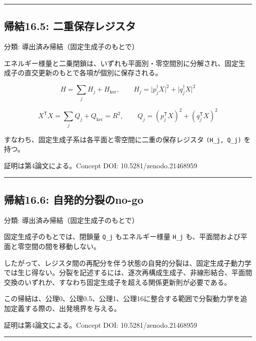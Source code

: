 \documentclass[
  a4paper,
]{ltjsarticle}
\begin{document}
\begin{center}\rule{0.5\linewidth}{0.5pt}\end{center}

\subsection{帰結16.5:
二重保存レジスタ}\label{ux5e30ux7d5016.5-ux4e8cux91cdux4fddux5b58ux30ecux30b8ux30b9ux30bf}

分類: 導出済み帰結（固定生成子のもとで）

エネルギー様量と二乗閉鎖は、いずれも平面別・零空間別に分解され、固定生成子の直交更新のもとで各項が個別に保存される。

\[
H=\sum_{j}H_j+H_{\ker},
\qquad
H_j=\lvert p_j^\dagger X\rvert^2+\lvert q_j^\dagger X\rvert^2
\]

\[
X^{\mathsf T}X=\sum_{j}Q_j+Q_{\ker}=R^2,
\qquad
Q_j=(p_j^{\mathsf T}X)^2+(q_j^{\mathsf T}X)^2
\]

すなわち、固定生成子系は各平面と零空間に二重の保存レジスタ
\texttt{(H\_j,\ Q\_j)} を持つ。

証明は第4論文による。Concept DOI: 10.5281/zenodo.21468959

\begin{center}\rule{0.5\linewidth}{0.5pt}\end{center}

\subsection{帰結16.6:
自発的分裂のno-go}\label{ux5e30ux7d5016.6-ux81eaux767aux7684ux5206ux88c2ux306eno-go}

分類: 導出済み帰結（固定生成子のもとで）

固定生成子のもとでは、閉鎖量 \texttt{Q\_j} もエネルギー様量
\texttt{H\_j} も、平面間および平面と零空間の間を移動しない。

したがって、レジスタ間の再配分を伴う状態の自発的分裂は、固定生成子動力学では生じ得ない。分裂を記述するには、逐次再構成生成子、非線形結合、平面間交換のいずれか、すなわち固定生成子を超える関係更新則が必要である。

この帰結は、公理0、公理0.5、公理1、公理16に整合する範囲で分裂動力学を追加定義する際の、出発境界を与える。

証明は第4論文による。Concept DOI: 10.5281/zenodo.21468959

\begin{center}\rule{0.5\linewidth}{0.5pt}\end{center}
\end{document}
